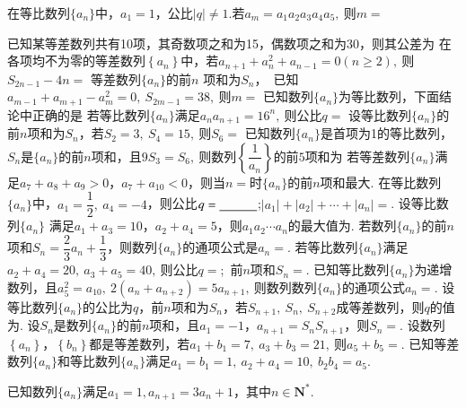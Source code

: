 \documentclass[marginline,noindent,answers,adobefonts]{BHCexam}
\newcommand{\an}{\{a_n\}}
\begin{document}
\begin{questions}
\qs 在等比数列$\{a_n\}$中，$a_1=1$，公比$ \left|q\right|\ne 1 .$若$ a_m=a_1a_2a_3a_4a_5,~ $则$ m= $\xx
{}

\qs 已知某等差数列共有10项，其奇数项之和为15，偶数项之和为30，则其公差为\xx
{}
\qs 在各项均不为零的等差数列$\left\{a_n\right\}$中，若$ a_{n+1}+a^2_n+a_{n-1}=0(n\ge 2),~$则$ S_{2n-1}-4n= $\xx
{}
\qs 等差数列$\{a_n\}$的前$ n $ 项和为$S_n$，~已知$ a_{m-1}+a_{m+1}-a_m^2=0,~S_{2m-1}=38,~ $则$ m= $\xx
{}
\qs 已知数列$\{a_n\}$为等比数列，下面结论中正确的是\xx
{}
\qs 若等比数列$\{a_n\}$满足$ a_na_{n+1}=16^n,~ $则公比$ q= $\xx
{}
\qs 设等比数列$\{a_n\}$的前$n$项和为$S_n$，若$ S_2=3,~S_4=15,~ $则$ S_6= $\xx
{}
\qs 已知数列$\{a_n\}$是首项为1的等比数列，$S_n$是$\{a_n\}$的前$ n $项和，且$ 9S_3=S_6 ,~$则数列$ \left\{\dfrac{1}{a_n}\right\} $的前$ 5 $项和为\xx
{}
\qs 若等差数列$\an$满足$ a_7+a_8+a_9>0$，$ a_7+a_{10}<0 $，则当$n=$\tk 时$\an$的前$n$项和最大.  
\qs 在等比数列$\{a_n\}$中，$a_1=\dfrac{1}{2},~a_4=-4$，则公比$ q=\underline{\hspace{3em}} $;$ |a_1|+|a_2|+\cdots+|a_n|= $\tk. 
\qs 设等比数列$\{a_n\}$  满足$ a_1+a_3=10 $，$a_2+a_4=5$，则$ a_1a_2\cdots a_n $的最大值为\tk.
\qs 若数列$\{a_n\}$的前$n$项和$S_n=\dfrac{2}{3}a_n+\dfrac{1}{3}$，则数列$\{a_n\}$的通项公式是$a_n=$\tk. 
\qs 若等比数列$\{a_n\}$满足$ a_2+a_4=20,~a_3+a_5=40,~$则公比$ q= $\tk;~前$ n $项和$S_n=$\tk.
\qs 已知等比数列$\{a_n\}$为递增数列，且$ a_5^2=a_{10},~2(a_n+a_{n+2})=5a_{n+1},~ $则数列数列$\{a_n\}$的通项公式$ a_n= $\tk.
\qs 设等比数列$\{a_n\}$的公比为$ q $，前$n$项和为$S_n$，若$ S_{n+1},~S_n,~S_{n+2} $成等差数列，则$ q $的值为\tk.
\question
设$S_n$是数列$\{a_n\}$的前$n$项和，且$a_1=-1$，$a_{n+1}=S_nS_{n+1}$，则$S_n=$\tk.
\qs 设数列$\left\{a_n\right\}$，$\left\{b_n\right\}$都是等差数列，若$ a_1+b_1=7,~a_3+b_3=21,~ $则$ a_5+b_5= $\tk.
\newpage
\qs 已知等差数列$\{a_n\}$和等比数列$\{a_n\}$满足$ a_1=b_1=1,~a_2+a_4=10,~b_2b_4=a_5. $
\kongbai
\question
已知数列$\{a_n\}$满足$a_1=1,a_{n+1}=3a_n+1$，其中$n\in \mathbf{N^*}.$
\begin{parts}

\end{parts}
\end{questions}
\end{document}
